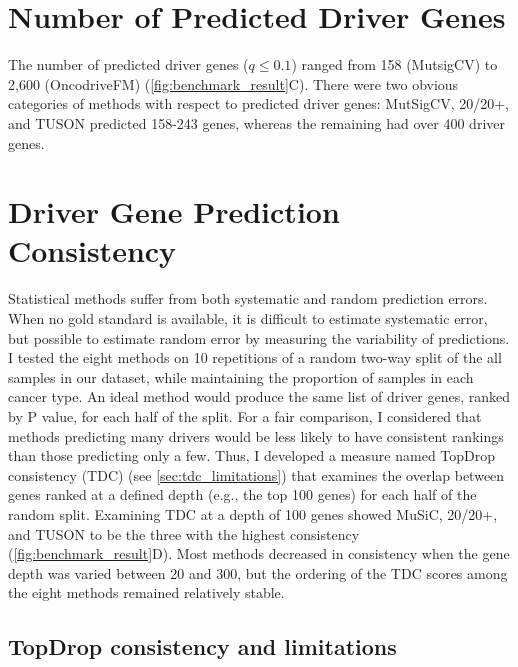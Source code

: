 \section{Number of Predicted Driver Genes}

The number of predicted driver genes ($q \leq 0.1$) ranged from 158 (MutsigCV) to 2,600 (OncodriveFM) (\autoref{fig:benchmark_result}C). There were two obvious categories of methods with respect to predicted driver genes: MutSigCV, 20/20+, and TUSON predicted 158-243 genes, whereas the remaining had over 400 driver genes.

\section{Driver Gene Prediction Consistency}

Statistical methods suffer from both systematic and random prediction errors. When no gold standard is available, it is difficult to estimate systematic error, but possible to estimate random error by measuring the variability of predictions. I tested the eight methods on 10 repetitions of a random two-way split of the all samples in our dataset, while maintaining the proportion of samples in each cancer type. An ideal method would produce the same list of driver genes, ranked by P value, for each half of the split. For a fair comparison, I considered that methods predicting many drivers would be less likely to have consistent rankings than those predicting only a few. Thus, I developed a measure named TopDrop consistency (TDC) (see \autoref{sec:tdc_limitations}) that examines the overlap between genes ranked at a defined depth (e.g., the top 100 genes) for each half of the random split. Examining TDC at a depth of 100 genes showed MuSiC, 20/20+, and TUSON to be the three with the highest consistency (\autoref{fig:benchmark_result}D). Most methods decreased in consistency when the gene depth was varied between 20 and 300, but the ordering of the TDC scores among the eight methods remained relatively stable.

\subsection{TopDrop consistency and limitations}
\label{sec:tdc_limitations}

